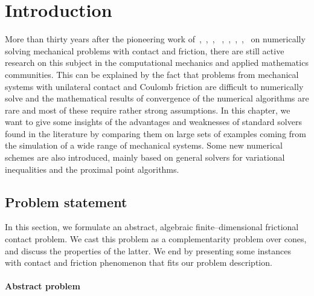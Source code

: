 \newcommand{\tb}[1]{\textcolor{blue}{#1}}
\newcommand{\tg}[1]{#1}
\newcommand{\tgg}[1]{\textcolor{applegreen}{#1}}
\newcommand{\moh}[1]{\textcolor{applegreen}{#1}}
\newcommand{\MM}[0]{\rightrightarrows}



\def\chapterorreport{chapter{}}






\section{Introduction}



More than thirty years after the pioneering work of~\cite{Panagiotopoulos_IA1975},~\cite{Necas.ea1980},~\cite{Haslinger1983,Haslinger1984,Haslinger.Panagiotopoulos_PRSE1984}, ~\cite{z-DelPieroMaceri_CISM1983,z-DelPieroMaceri_CISM1985},~\cite{Katona_IJNAMG1983},~\cite{Chaudhary.Bathe_CS1986},~\cite{Jean.Moreau1987},~\cite{Mitsopoulou.Doudoumis1988} on numerically solving mechanical problems with contact and friction, there are still active research  on this subject in the computational mechanics and applied mathematics communities.  This can be explained by the fact that {problems from} mechanical systems with unilateral contact and Coulomb friction are difficult to numerically solve and the mathematical results of convergence of the numerical algorithms are rare and most of these require rather strong assumptions. In this \chapterorreport{}, we want to give some insights of the advantages and weaknesses of standard solvers found in the literature by comparing them on large sets of examples coming from the simulation of a wide range of mechanical systems. Some new numerical schemes are also introduced, mainly based on general solvers for variational inequalities and the proximal point algorithms.

\subsection{Problem statement}
In this section, we formulate an abstract, algebraic finite--dimensional frictional contact problem. We cast this problem as a complementarity problem over cones, and discuss the properties of the latter.
We end by presenting some instances with contact and friction phenomenon that fits our problem description.

\paragraph{Abstract problem}

